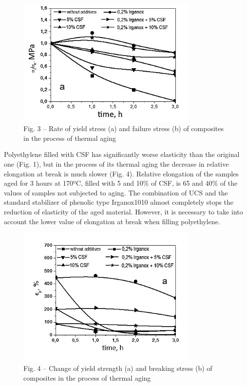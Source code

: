 \begin{figure}[H]
	\centering
	\includegraphics[width=0.8\textwidth]{media/chem/image22}
	\caption*{Fig. 3 -- Rate of yield stress (a) and failure stress (b) of
composites in the process of thermal aging}
\end{figure}

Polyethylene filled with CSF has significantly worse elasticity than the
original one (Fig. 1), but in the process of its thermal aging the
decrease in relative elongation at break is much slower (Fig. 4).
Relative elongation of the samples aged for 3 hours at 170ºC, filled
with 5 and 10\% of CSF, is 65 and 40\% of the values of samples not
subjected to aging. The combination of UCS and the standard stabilizer
of phenolic type Irganox1010 almost completely stops the reduction of
elasticity of the aged material. However, it is necessary to take into
account the lower value of elongation at break when filling
polyethylene.

\begin{figure}[H]
	\centering
	\includegraphics[width=0.8\textwidth]{media/chem/image24}
	\caption*{Fig. 4 -- Change of yield strength (a) and breaking stress (b)
of composites in the process of thermal aging}
\end{figure}

